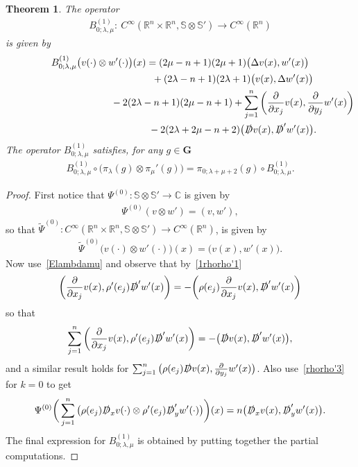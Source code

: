 \documentclass[10pt,a4paper]{amsart}
\newcommand{\fsl}[1]{{\slashed{#1}}} %
\numberwithin{equation}{section}
\newtheorem{theor}{Theorem}[section]
\begin{document}
\begin{theor}
The operator
\begin{gather*}
B_{0;\lambda, \mu}^{(1)} \colon\ C^\infty(\mathbb R^n\times \mathbb R^n, \mathbb S\otimes \mathbb S') \to C^\infty(\mathbb R^n)
\end{gather*}
is given by
\begin{gather}
B_{0;\lambda, \mu}^{(1)}\big(v(\cdot)\otimes w'(\cdot)\big)(x) =
(2\mu-n+1) (2\mu+1)\big( \Delta v(x), w'(x)\big) \nonumber
\\ \hphantom{B_{0;\lambda, \mu}^{(1)}\big(v(\cdot)\otimes w'(\cdot)\big)(x) =}
{}+(2\lambda-n+1)(2\lambda+1)\big(v(x), \Delta w'(x)\big)\nonumber
\\ \hphantom{B_{0;\lambda, \mu}^{(1)}\big(v(\cdot)\otimes w'(\cdot)\big)(x) =}
{} -2(2\lambda-n+1)(2\mu-n+1)
 +\sum_{j=1}^n \bigg(\frac{\partial}{\partial x_j}v(x), \frac{\partial}{\partial y_j}w'(x)\bigg)\nonumber
 \\ \hphantom{B_{0;\lambda, \mu}^{(1)}\big(v(\cdot)\otimes w'(\cdot)\big)(x) =}
{}-2(2\lambda+2\mu-n+2)\big( \fsl{D}v(x), \fsl{D}'w'(x)\big).\label{B_0}
\end{gather}
The operator $B_{0;\lambda, \mu}^{(1)}$ satisfies, for any $g\in \mathbf G$
\begin{gather*}
B_{0;\lambda, \mu}^{(1)}\circ \big(\pi_\lambda(g) \otimes \pi_\mu'(g)\big) = \pi_{0;\lambda+\mu+2}(g) \circ B_{0;\lambda, \mu}^{(1)} .
\end{gather*}
\end{theor}
\begin{proof}
First notice that $\Psi^{(0)}\colon \mathbb S \otimes \mathbb S'\to \mathbb C$ is given by
\begin{gather*}
\Psi^{(0)} (v\otimes w') = (v,w'),
\end{gather*}
so that $\widetilde \Psi^{(0)} \colon C^\infty(\mathbb R^n \times \mathbb R^n,\mathbb S\otimes \mathbb S')\to C^\infty(\mathbb R^n)$, is given by
\begin{gather*}
\widetilde \Psi^{(0)}\big(v(\cdot)\otimes w'(\cdot)\big)(x) = \big(v(x),w'(x)\big) .
\end{gather*}
Now use~\eqref{Elambdamu} and observe that by~\eqref{1rhorho'1}
\begin{gather*}
\bigg(\frac{\partial}{\partial x_j} v(x), \rho'(e_j) \fsl{D}'w'(x) \bigg) = -\bigg(\rho(e_j) \frac{\partial}{\partial x_j} v(x), \fsl{D}'w'(x)\bigg)
\end{gather*}
so that
\begin{gather*}
\sum_{j=1}^n \bigg(\frac{\partial}{\partial x_j} v(x), \rho'(e_j) \fsl{D}'w'(x) \bigg) = -\big( \fsl{D} v(x), \fsl{D}'w'(x)\big),
\end{gather*}
and a similar result holds for $\sum_{j=1}^n \big( \rho(e_j) \fsl{D}v(x), \frac{\partial}{\partial y_j} w'(x) \big) $. Also use~\eqref{rhorho'3} for $k=0$ to get
\begin{gather*}
\Psi^{(0)}\bigg(\sum_{j=1}^n \big(\rho(e_j) \fsl{D}_x v(\cdot)\otimes \rho'(e_j) \fsl{D}'_y w'(\cdot) \big)\bigg)(x)=n \big( \fsl{D}_x v(x), \fsl{D}'_y w'(x)\big).
\end{gather*}
The final expression for $B_{0;\lambda,\mu}^{(1)}$ is obtained by putting together the partial computations.
\end{proof}
\end{document}
